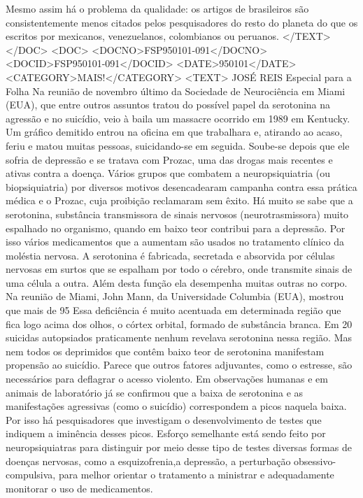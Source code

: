 Mesmo assim há o problema da qualidade: os artigos de brasileiros são consistentemente menos citados pelos pesquisadores do resto do planeta do que os escritos por mexicanos, venezuelanos, colombianos ou peruanos.
</TEXT>
</DOC>
<DOC>
<DOCNO>FSP950101-091</DOCNO>
<DOCID>FSP950101-091</DOCID>
<DATE>950101</DATE>
<CATEGORY>MAIS!</CATEGORY>
<TEXT>
JOSÉ REIS 
Especial para a Folha 
Na reunião de novembro último da Sociedade de Neurociência em Miami (EUA), que entre outros assuntos tratou do possível papel da serotonina na agressão e no suicídio, veio à baila um massacre ocorrido em 1989 em Kentucky.
Um gráfico demitido entrou na oficina em que trabalhara e, atirando ao acaso, feriu e matou muitas pessoas, suicidando-se em seguida. Soube-se depois que ele sofria de depressão e se tratava com Prozac, uma das drogas mais recentes e ativas contra a doença.
Vários grupos que combatem a neuropsiquiatria (ou biopsiquiatria) por diversos motivos desencadearam campanha contra essa prática médica e o Prozac, cuja proibição reclamaram sem êxito.
Há muito se sabe que a serotonina, substância transmissora de sinais nervosos (neurotrasmissora) muito espalhado no organismo, quando em baixo teor contribui para a depressão. Por isso vários medicamentos que a aumentam são usados no tratamento clínico da moléstia nervosa.
A serotonina é fabricada, secretada e absorvida por células nervosas em surtos que se espalham por todo o cérebro, onde transmite sinais de uma célula a outra. Além desta função ela desempenha muitas outras no corpo.
Na reunião de Miami, John Mann, da Universidade Columbia (EUA), mostrou que mais de 95%
Essa deficiência é muito acentuada em determinada região que fica logo acima dos olhos, o córtex orbital, formado de substância branca. Em 20 suicidas autopsiados praticamente nenhum revelava serotonina nessa região.
Mas nem todos os deprimidos que contêm baixo teor de serotonina manifestam propensão ao suicídio. Parece que outros fatores adjuvantes, como o estresse, são necessários para deflagrar o acesso violento.
Em observações humanas e em animais de laboratório já se confirmou que a baixa de serotonina e as manifestações agressivas (como o suicídio) correspondem a picos naquela baixa. Por isso há pesquisadores que investigam o desenvolvimento de testes que indiquem a iminência desses picos.
Esforço semelhante está sendo feito por neuropsiquiatras para distinguir por meio desse tipo de testes diversas formas de doenças nervosas, como a esquizofrenia,a depressão, a perturbação obsessivo-compulsiva, para melhor orientar o tratamento a ministrar e adequadamente monitorar o uso de medicamentos.
